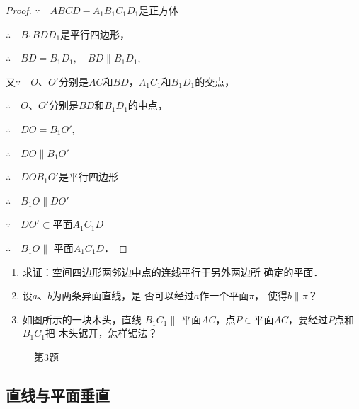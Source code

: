 \begin{proof}  
  $\because\quad ABCD-A_1B_1C_1D_1$是正方体

$\therefore\quad   B_1BDD_1$是平行四边形，

$\therefore\quad BD=B_1D_1,\quad  BD\parallel B_1D_1$,

又$\because\quad O$、$O'$分别是$AC$和$BD$，$A_1C_1$和$B_1D_1$的交点，

$\therefore\quad O$、$O'$分别是$BD$和$B_1D_1$的中点，

$\therefore\quad DO=B_1O'$,

$\therefore\quad   DO\parallel B_1O'$

$\therefore\quad   DOB_1O'$是平行四边形

$\therefore\quad   B_1O\parallel DO'$

$\because\quad DO'\subset$平面$A_1C_1D$

$\therefore\quad  B_1O\parallel$ 平面$A_1C_1D$．
\end{proof}

\begin{ex}
\begin{enumerate}
  \item 求证：空间四边形两邻边中点的连线平行于另外两边所
  确定的平面．
  \item 设$a$、$b$为两条异面直线，是
  否可以经过$a$作一个平面$\pi$，
  使得$b\parallel \pi$？
  \item 如图所示的一块木头，直线
  $B_1C_1\parallel$ 平面$AC$，点$P\in$平面$AC$，要经过$P$点和$B_1C_1$把
  木头锯开，怎样锯法？
\end{enumerate}
\end{ex}

\begin{figure}[htp]
  \centering
{}
  \caption*{第3题}
\end{figure}

\subsection{直线与平面垂直}

